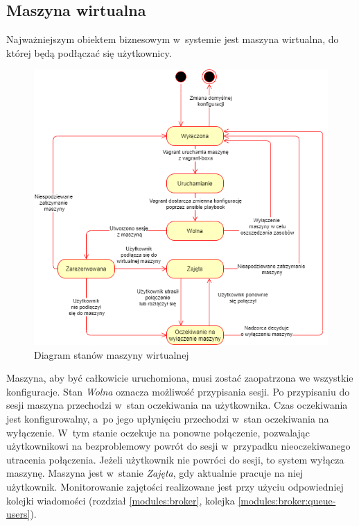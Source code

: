 \documentclass[../opis-rozwiazania.tex]{subfiles}
\begin{document}
\label{state_diagrams}

\subsection{Maszyna wirtualna}
Najważniejszym obiektem biznesowym w~systemie jest maszyna wirtualna, do której będą podłączać się użytkownicy.

\begin{figure}[H]
  \centering
  \includegraphics[width=\textwidth]{../diagrams/state_diagrams/virtual_machine.png}
  \caption{Diagram stanów maszyny wirtualnej}
  \label{state_vm}
\end{figure}

Maszyna, aby być całkowicie uruchomiona, musi zostać zaopatrzona we wszystkie konfiguracje.
Stan \textit{Wolna} oznacza możliwość przypisania sesji.
Po przypisaniu do sesji maszyna przechodzi w~stan oczekiwania na użytkownika.
Czas oczekiwania jest konfigurowalny, a~po jego upłynięciu przechodzi w~stan oczekiwania na wyłączenie.
W~tym stanie oczekuje na ponowne połączenie, pozwalając użytkownikowi na bezproblemowy powrót do sesji w~przypadku nieoczekiwanego utracenia połączenia.
Jeżeli użytkownik nie powróci do sesji, to system wyłącza maszynę.
Maszyna jest w~stanie \textit{Zajęta}, gdy aktualnie pracuje na niej użytkownik. Monitorowanie zajętości realizowane jest przy użyciu odpowiedniej kolejki wiadomości (rozdział \ref{modules:broker}, kolejka \ref{modules:broker:queue-users}).
\end{document}
